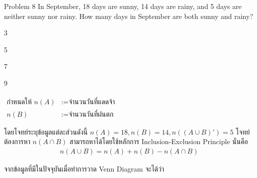 \documentclass[11pt]{scrartcl}
\begin{document}
\begin{problembox}{Problem 8}
In September, 18 days are sunny, 14 days are rainy, and 5 days are neither sunny nor rainy. How many days in September are both sunny and rainy?

\begin{choices}
\item 3
\item 5
\item 7
\item 9
\end{choices}
\end{problembox}

\begin{solutionbox}
  \begin{flushleft}
  $\begin{aligned}
    \text{กำหนดให้ } n(A) &:= \text{จำนวนวันที่แดดจ้า} \\
    n(B) &:= \text{จำนวนวันที่ฝนตก}
  \end{aligned}$
  \end{flushleft}

  โดยโจทย์ระบุข้อมูลแต่ละส่วนดังนี้ $n(A) = 18, n(B) = 14, n((A \cup B)') = 5$ โจทย์ต้องการหา $n(A \cap B)$ สามารถหาได้โดยใช้หลักการ Inclusion-Exclusion Principle นั่นคือ 
  \begin{align*}
    n(A \cup B) = n(A)+n(B)-n(A \cap B)
  \end{align*}

  จากข้อมูลที่มีในปัจจุบันเมื่อทำการวาด Venn Diagram จะได้ว่า

  \begin{center}
\end{center}
\end{solutionbox}
\end{document}
